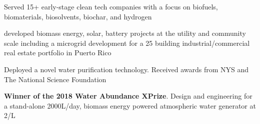 \documentclass[]{deedy-resume-openfont}
\begin{document}
\begin{minipage}[t]{0.67\textwidth}
\begin{tightemize}
\item Served 15+ early-stage clean tech companies with a focus on biofuels, biomaterials, biosolvents, biochar, and hydrogen
\item developed biomass energy, solar, battery projects at the utility and community scale including a microgrid development for a 25 building industrial/commercial real estate portfolio in Puerto Rico
\end{tightemize}


\begin{tightemize}
\item Deployed a novel water purification technology. Received awards from NYS and The National Science Foundation
\end{tightemize}


\begin{tightemize}
\item \textbf{Winner of the 2018 Water Abundance XPrize}. Design and engineering for a stand-alone 2000L/day, biomass energy powered atmospheric water generator at 2\cent/L
\end{tightemize}


\end{minipage}
\end{document}
